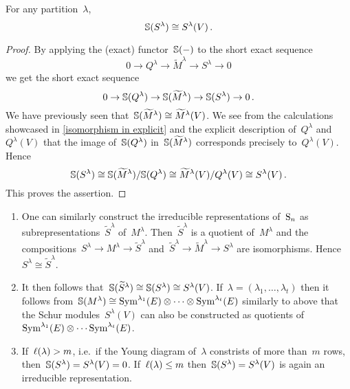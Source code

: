 \documentclass[a4paper,10pt]{scrartcl}
\begin{document}
\begin{theorem}
  For any partition~$\lambda$,
  \[
    \mathbb{S}(S^\lambda) \cong S^{\lambda}(V) \,.
  \]
\end{theorem}

\begin{proof}
  By applying the (exact) functor~$\mathbb{S}(-)$ to the short exact sequence
  \[
    0
    \to
    Q^\lambda
    \to
    \widetilde{M}^\lambda
    \to
    S^\lambda
    \to
    0
  \]
  we get the short exact sequence
  \[
    0
    \to
    \mathbb{S}(Q^\lambda)
    \to
    \mathbb{S}(\widetilde{M}^\lambda)
    \to
    \mathbb{S}(S^\lambda)
    \to
    0 \,.
  \]
  We have previously seen that~$\mathbb{S}(\widetilde{M}^\lambda) \cong \widetilde{M}^\lambda(V)$.
  We see from the calculations showcased in \cref{isomorphism in explicit} and the explicit description of~$Q^\lambda$ and~$Q^{\lambda}(V)$ that the image of~$\mathbb{S}(Q^\lambda)$ in~$\mathbb{S}(\widetilde{M}^\lambda)$ corresponds precisely to~$Q^{\lambda}(V)$.
  Hence
  \[
    \mathbb{S}(S^\lambda)
    \cong
    \mathbb{S}(\widetilde{M}^\lambda)/\mathbb{S}(Q^\lambda)
    \cong
    \widetilde{M}^{\lambda}(V)/Q^{\lambda}(V)
    \cong
    S^{\lambda}(V) \,.
  \]
  This proves the assertion.
\end{proof}


\begin{remark}
  \label{remark on schur functor}
  \leavevmode
  \begin{enumerate}
    \item
      One can similarly construct the irreducible representations of~$\operatorname{S}_n$ as subrepresentations~$\widetilde{S}^\lambda$ of~$M^\lambda$.
      Then~$\widetilde{S}^\lambda$ is a quotient of~$M^\lambda$ and the compositions~$S^\lambda \to M^\lambda \to \widetilde{S}^\lambda$ and~$\widetilde{S}^\lambda \to \widetilde{M}^\lambda \to S^\lambda$ are isomorphisms.
      Hence~$S^\lambda \cong \tilde{S}^\lambda$.
    \item
      It then follows that~$\mathbb{S}(\widetilde{S}^\lambda) \cong \mathbb{S}(S^\lambda) \cong S^{\lambda}(V)$.
      If~$\lambda = (\lambda_1, \dotsc, \lambda_t)$ then it follows from~$\mathbb{S}(M^\lambda) \cong \operatorname{Sym}^{\lambda_1}(E) \otimes \dotsb \otimes \operatorname{Sym}^{\lambda_t}(E)$ similarly to above that the Schur modules~$S^{\lambda}(V)$ can also be constructed as quotients of~$\operatorname{Sym}^{\lambda_1}(E) \otimes \dotsb \operatorname{Sym}^{\lambda_t}(E)$.
    \item
      \label{kernel of schur functor}
      If~$\operatorname{\ell}(\lambda) > m$, i.e.\ if the Young diagram of~$\lambda$ constrists of more than~$m$ rows, then~$\mathbb{S}(S^\lambda) = S^\lambda(V) = 0$.
      If~$\operatorname{\ell}(\lambda) \leq m$ then~$\mathbb{S}(S^\lambda) = S^\lambda(V)$ is again an irreducible representation.
  \end{enumerate}
\end{remark}
\end{document}
